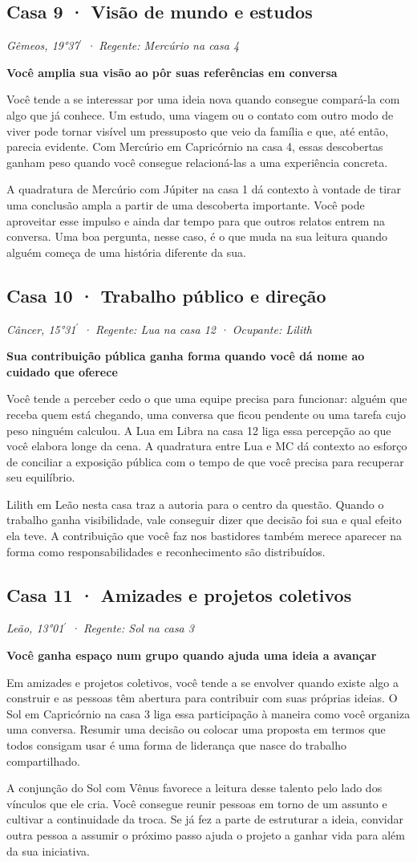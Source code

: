 \documentclass[11pt,a4paper]{article}
\newcommand{\leitura}[3]{\subsection{#1}\textit{#2}\par #3}
\newcommand{\subtituloleitura}[1]{\textbf{#1}\par\nopagebreak[4]}
\begin{document}
\leitura{Casa 9 · Visão de mundo e estudos}{Gêmeos, 19°37\ensuremath{^{\prime}} · Regente: Mercúrio na casa 4}{
\subtituloleitura{Você amplia sua visão ao pôr suas referências em conversa}
Você tende a se interessar por uma ideia nova quando consegue compará-la com algo que já conhece. Um estudo, uma viagem ou o contato com outro modo de viver pode tornar visível um pressuposto que veio da família e que, até então, parecia evidente. Com Mercúrio em Capricórnio na casa 4, essas descobertas ganham peso quando você consegue relacioná-las a uma experiência concreta.

A quadratura de Mercúrio com Júpiter na casa 1 dá contexto à vontade de tirar uma conclusão ampla a partir de uma descoberta importante. Você pode aproveitar esse impulso e ainda dar tempo para que outros relatos entrem na conversa. Uma boa pergunta, nesse caso, é o que muda na sua leitura quando alguém começa de uma história diferente da sua.
}

\leitura{Casa 10 · Trabalho público e direção}{Câncer, 15°31\ensuremath{^{\prime}} · Regente: Lua na casa 12 · Ocupante: Lilith}{
\subtituloleitura{Sua contribuição pública ganha forma quando você dá nome ao cuidado que oferece}
Você tende a perceber cedo o que uma equipe precisa para funcionar: alguém que receba quem está chegando, uma conversa que ficou pendente ou uma tarefa cujo peso ninguém calculou. A Lua em Libra na casa 12 liga essa percepção ao que você elabora longe da cena. A quadratura entre Lua e MC dá contexto ao esforço de conciliar a exposição pública com o tempo de que você precisa para recuperar seu equilíbrio.

Lilith em Leão nesta casa traz a autoria para o centro da questão. Quando o trabalho ganha visibilidade, vale conseguir dizer que decisão foi sua e qual efeito ela teve. A contribuição que você faz nos bastidores também merece aparecer na forma como responsabilidades e reconhecimento são distribuídos.
}

\leitura{Casa 11 · Amizades e projetos coletivos}{Leão, 13°01\ensuremath{^{\prime}} · Regente: Sol na casa 3}{
\subtituloleitura{Você ganha espaço num grupo quando ajuda uma ideia a avançar}
Em amizades e projetos coletivos, você tende a se envolver quando existe algo a construir e as pessoas têm abertura para contribuir com suas próprias ideias. O Sol em Capricórnio na casa 3 liga essa participação à maneira como você organiza uma conversa. Resumir uma decisão ou colocar uma proposta em termos que todos consigam usar é uma forma de liderança que nasce do trabalho compartilhado.

A conjunção do Sol com Vênus favorece a leitura desse talento pelo lado dos vínculos que ele cria. Você consegue reunir pessoas em torno de um assunto e cultivar a continuidade da troca. Se já fez a parte de estruturar a ideia, convidar outra pessoa a assumir o próximo passo ajuda o projeto a ganhar vida para além da sua iniciativa.
}
\end{document}
